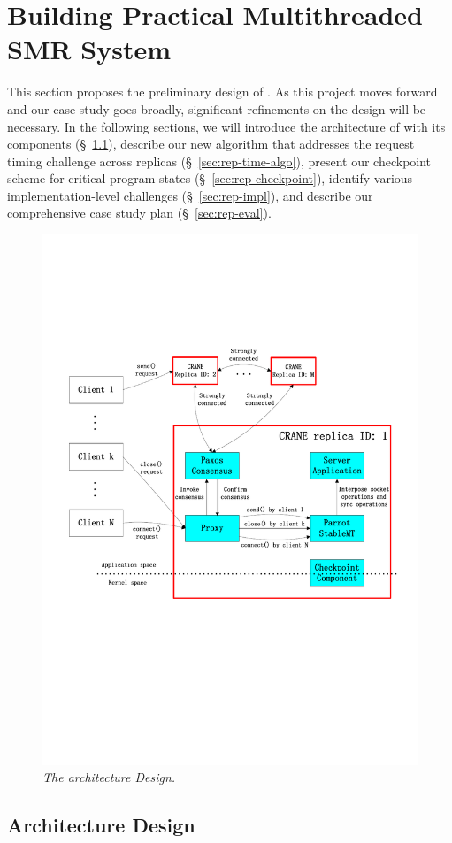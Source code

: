 \section{Building Practical Multithreaded SMR System} \label{sec:crane-plan}

This section proposes the preliminary design of \crane. As this project moves
forward and our case study goes broadly, significant refinements on the design
will be necessary. In the following sections, we will introduce the architecture
of \crane with its components (\S~\ref{sec:rep-arch}), describe our new
algorithm that addresses the request timing challenge across replicas
(\S~\ref{sec:rep-time-algo}), present our checkpoint scheme for critical program
states (\S~\ref{sec:rep-checkpoint}), identify various implementation-level
challenges (\S~\ref{sec:rep-impl}), and describe our comprehensive case study
plan (\S~\ref{sec:rep-eval}). 

\begin{figure}[t]
\centering
\includegraphics[width=0.67\columnwidth]{figures/architecture}
\vspace{-.05in}
\caption{{\em The \crane architecture Design.}} \label{fig:arch}
\vspace{-.05in}
\end{figure}

\subsection{\crane Architecture Design} \label{sec:rep-arch}

